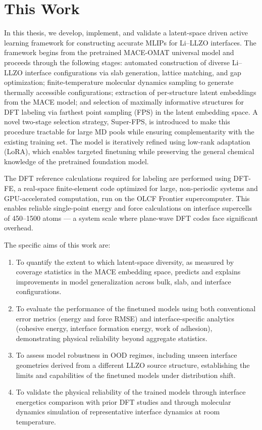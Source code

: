 \documentclass[12pt,a4paper,oneside]{book}
\begin{document}
\section{This Work}

In this thesis, we develop, implement, and validate a latent-space driven active
learning framework for constructing accurate MLIPs for Li--LLZO interfaces. The
framework begins from the pretrained MACE-OMAT universal model and proceeds through
the following stages: automated construction of diverse Li--LLZO interface
configurations via slab generation, lattice matching, and gap optimization;
finite-temperature molecular dynamics sampling to generate thermally accessible
configurations; extraction of per-structure latent embeddings from the MACE model;
and selection of maximally informative structures for DFT labeling via farthest point
sampling (FPS) in the latent embedding space. A novel two-stage selection strategy,
Super-FPS, is introduced to make this procedure tractable for large MD pools while
ensuring complementarity with the existing training set. The model is iteratively
refined using low-rank adaptation (LoRA), which enables targeted finetuning while
preserving the general chemical knowledge of the pretrained foundation model.

The DFT reference calculations required for labeling are performed using DFT-FE, a
real-space finite-element code optimized for large, non-periodic systems and
GPU-accelerated computation, run on the OLCF Frontier supercomputer. This enables
reliable single-point energy and force calculations on interface supercells of
450--1500 atoms --- a system scale where plane-wave DFT codes face significant
overhead.

The specific aims of this work are:

\begin{enumerate}
    \item To quantify the extent to which latent-space diversity, as measured by
    coverage statistics in the MACE embedding space, predicts and explains improvements
    in model generalization across bulk, slab, and interface configurations.

    \item To evaluate the performance of the finetuned models using both conventional
    error metrics (energy and force RMSE) and interface-specific analytics (cohesive
    energy, interface formation energy, work of adhesion), demonstrating physical
    reliability beyond aggregate statistics.

    \item To assess model robustness in OOD regimes, including unseen interface
    geometries derived from a different LLZO source structure, establishing the limits
    and capabilities of the finetuned models under distribution shift.

    \item To validate the physical reliability of the trained models through interface
    energetics comparison with prior DFT studies and through molecular dynamics
    simulation of representative interface dynamics at room temperature.
\end{enumerate}
\end{document}
